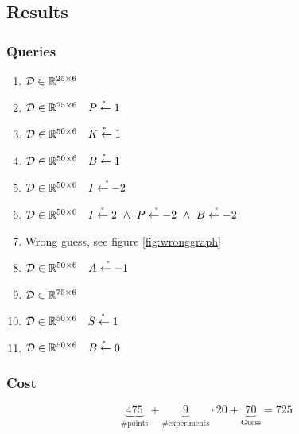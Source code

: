 \documentclass[12pt,fleqn,]{article}
\begin{document}
\begin{multicols}{2}
%

\section{Results}

\subsubsection*{Queries}
\vspace*{-0.01cm}
\begin{enumerate}[]
	\item \(\mathcal D \in \mathbb R^{25\times 6}\)
	\item \(\mathcal D \in \mathbb R^{25\times 6}\quad \mathring{P\leftarrow1}\) 
	\item \(\mathcal D \in \mathbb R^{50\times 6}\quad \mathring{K\leftarrow1}\) 
	\item \(\mathcal D \in \mathbb R^{50\times 6}\quad \mathring{B\leftarrow1}\) 
	\item \(\mathcal D \in \mathbb R^{50\times 6}\quad \mathring{I\leftarrow-2}\) 
	\item \(\mathcal D \in \RR^{50\times 6}\quad \mathring{I\leftarrow2}\ \wedge\ \mathring{P\leftarrow-2}\ \wedge\ \mathring{B\leftarrow-2}\)
	\item Wrong guess, see figure \ref{fig:wronggraph}

	\item \(\mathcal D \in \mathbb R^{50\times 6}\quad  \mathring{A\leftarrow-1}\) 
	\item \(\mathcal D \in \mathbb R^{75\times 6}\) 
	\item \(\mathcal D \in \mathbb R^{50\times 6}\quad  \mathring{S\leftarrow1}\)
	\item \(\mathcal D \in \mathbb R^{50\times 6}\quad  \mathring{B\leftarrow0}\) 
\end{enumerate}
\vspace*{-0.6cm}
\subsubsection*{Cost}
\[
\underbrace{475}_{\text{\# points}} + \underbrace {9}_ {\text{\# experiments}} \cdot 20 +\underbrace{70}_{\text{Guess}}=725
\]


\end{multicols}
\end{document}
